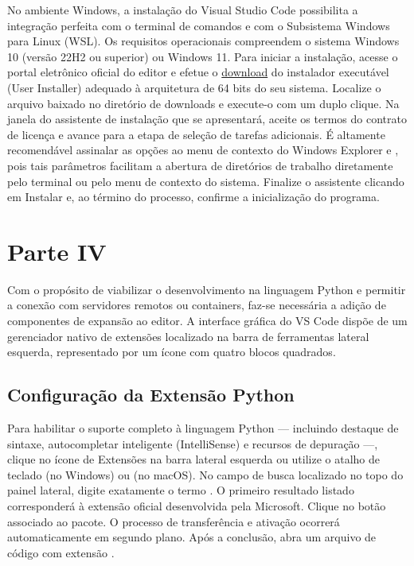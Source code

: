 No ambiente Windows, a instalação do Visual Studio Code possibilita a integração perfeita com o terminal de comandos e com o Subsistema Windows para Linux (WSL). Os requisitos operacionais compreendem o sistema Windows 10 (versão 22H2 ou superior) ou Windows 11.
Para iniciar a instalação, acesse o portal eletrônico oficial do editor e efetue o \href{https://code.visualstudio.com/download?_exp_download=fb315fc982}{download} do instalador executável (User Installer) adequado à arquitetura de 64 bits do seu sistema. Localize o arquivo baixado no diretório de downloads e execute-o com um duplo clique. Na janela do assistente de instalação que se apresentará, aceite os termos do contrato de licença e avance para a etapa de seleção de tarefas adicionais. É altamente recomendável assinalar as opções  ao menu de contexto do Windows Explorer e , pois tais parâmetros facilitam a abertura de diretórios de trabalho diretamente pelo terminal ou pelo menu de contexto do sistema. Finalize o assistente clicando em Instalar e, ao término do processo, confirme a inicialização do programa.


\section*{Parte IV}

Com o propósito de viabilizar o desenvolvimento na linguagem Python e permitir a conexão com servidores remotos ou containers, faz-se necessária a adição de componentes de expansão ao editor. A interface gráfica do VS Code dispõe de um gerenciador nativo de extensões localizado na barra de ferramentas lateral esquerda, representado por um ícone com quatro blocos quadrados.

\subsection*{Configuração da Extensão Python}

Para habilitar o suporte completo à linguagem Python — incluindo destaque de sintaxe, autocompletar inteligente (IntelliSense) e recursos de depuração —, clique no ícone de Extensões na barra lateral esquerda ou utilize o atalho de teclado  (no Windows) ou  (no macOS).
No campo de busca localizado no topo do painel lateral, digite exatamente o termo . O primeiro resultado listado corresponderá à extensão oficial desenvolvida pela Microsoft. Clique no botão  associado ao pacote. O processo de transferência e ativação ocorrerá automaticamente em segundo plano. Após a conclusão, abra um arquivo de código com extensão .

